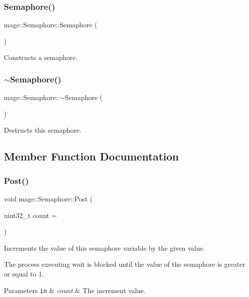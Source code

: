 \subsubsection{\texorpdfstring{Semaphore()}{Semaphore()}}
{\footnotesize\ttfamily mage\+::\+Semaphore\+::\+Semaphore (\begin{DoxyParamCaption}{ }\end{DoxyParamCaption})}

Constructs a semaphore. \hypertarget{classmage_1_1_semaphore_a991ed365c28e4a9c63ff34a5efeb012d}{}\label{classmage_1_1_semaphore_a991ed365c28e4a9c63ff34a5efeb012d} 
\subsubsection{\texorpdfstring{$\sim$\+Semaphore()}{~Semaphore()}}
{\footnotesize\ttfamily mage\+::\+Semaphore\+::$\sim$\+Semaphore (\begin{DoxyParamCaption}{ }\end{DoxyParamCaption})}

Destructs this semaphore. 

\subsection{Member Function Documentation}
\hypertarget{classmage_1_1_semaphore_a354ea9743f9794b14a3f032e0443b214}{}\label{classmage_1_1_semaphore_a354ea9743f9794b14a3f032e0443b214} 
\subsubsection{\texorpdfstring{Post()}{Post()}}
{\footnotesize\ttfamily void mage\+::\+Semaphore\+::\+Post (\begin{DoxyParamCaption}\item[{uint32\+\_\+t}]{count = {} }\end{DoxyParamCaption})}

Increments the value of this semaphore variable by the given value.

The process executing wait is blocked until the value of the semaphore is greater or equal to 1.


\begin{DoxyParams}[1]{Parameters}
\mbox{\tt in}  & {\em count} & The increment value. \\
\hline
\end{DoxyParams}
\hypertarget{classmage_1_1_semaphore_ab34cdf4e9b7388dbdb30aab167c074f6}{}\label{classmage_1_1_semaphore_ab34cdf4e9b7388dbdb30aab167c074f6} 
